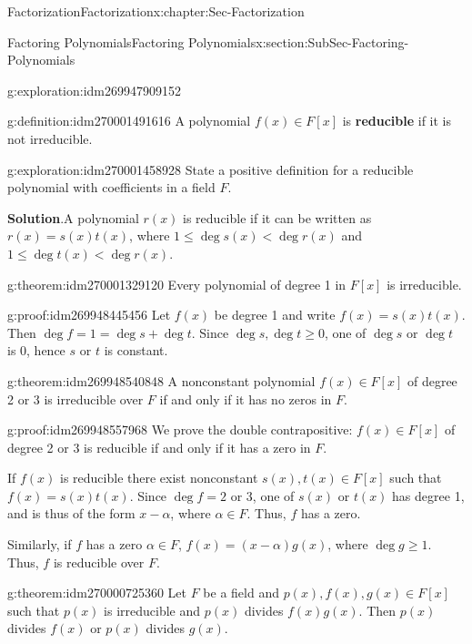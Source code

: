 \documentclass[oneside,10pt,]{book}
\newcommand{\terminology}[1]{\textbf{#1}}
\numberwithin{equation}{section}
\renewcommand{\le}{\leqslant}
\renewcommand{\ge}{\geqslant}
\newcommand{\lt}{<}
\begin{document}
\begin{chapterptx}{Factorization}{}{Factorization}{}{}{x:chapter:Sec-Factorization}
\begin{sectionptx}{Factoring Polynomials}{}{Factoring Polynomials}{}{}{x:section:SubSec-Factoring-Polynomials}
\begin{exploration}{}{g:exploration:idm269947909152}
\end{exploration}
\begin{definition}{}{g:definition:idm270001491616}%
A polynomial \(f(x)\in F[x]\) is \terminology{reducible} if it is not irreducible.%
\end{definition}
\begin{exploration}{}{g:exploration:idm270001458928}%
State a positive definition for a reducible polynomial with coefficients in a field \(F\).%
\par\smallskip%
\noindent\textbf{Solution}.\hypertarget{g:solution:idm270001419312}{}\quad{}A polynomial \(r(x)\) is reducible if it can be written as \(r(x) = s(x) t(x)\), where \(1 \le \deg s(x) \lt \deg r(x)\) and \(1 \le \deg t(x) \lt \deg r(x)\).%
\end{exploration}
\begin{theorem}{}{}{g:theorem:idm270001329120}%
Every polynomial of degree 1 in \(F[x]\) is irreducible.%
\end{theorem}
\begin{proofptx}{}{g:proof:idm269948445456}
Let \(f(x)\) be degree 1 and write \(f(x) = s(x) t(x)\). Then \(\deg f = 1 = \deg s + \deg t\). Since \(\deg s, \deg t \ge 0\), one of \(\deg s\) or \(\deg t\) is 0, hence \(s\) or \(t\) is constant.%
\end{proofptx}
\begin{theorem}{}{}{g:theorem:idm269948540848}%
A nonconstant polynomial \(f(x)\in F[x]\) of degree 2 or 3 is irreducible over \(F\) if and only if it has no zeros in \(F\).%
\end{theorem}
\begin{proofptx}{}{g:proof:idm269948557968}
We prove the double contrapositive: \(f(x)\in F[x]\) of degree 2 or 3 is reducible if and only if it has a zero in \(F\).%
\par
If \(f(x)\) is reducible there exist nonconstant \(s(x),t(x)\in F[x]\) such that \(f(x) = s(x) t(x)\). Since \(\deg f = 2\) or 3, one of \(s(x)\) or \(t(x)\) has degree 1, and is thus of the form \(x-\alpha\), where \(\alpha \in F\). Thus, \(f\) has a zero.%
\par
Similarly, if \(f\) has a zero \(\alpha\in F\), \(f(x) = (x-\alpha)g(x)\), where \(\deg g \ge 1\). Thus, \(f\) is reducible over \(F\).%
\end{proofptx}
\begin{theorem}{}{}{g:theorem:idm270000725360}%
Let \(F\) be a field and \(p(x),f(x),g(x)\in F[x]\) such that \(p(x)\) is irreducible and \(p(x)\) divides \(f(x) g(x)\). Then \(p(x)\) divides \(f(x)\) or \(p(x)\) divides \(g(x)\).%

\end{theorem}
\end{sectionptx}
\end{chapterptx}
\end{document}
